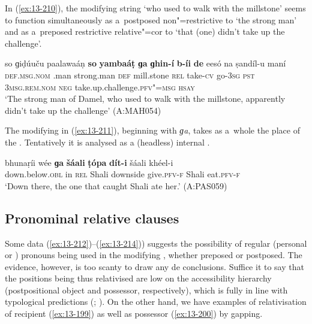 In (\ref{ex:13-210}), the modifying string `who used to walk with the millstone' seems to function simultaneously as a~postposed non"=restrictive  to `the \iliDameli strong man' and as a~preposed restrictive relative"=cor to `that (one) didn't take up the challenge'.

\begin{exe}
\ex
\label{ex:13-210}
\gll so ɡiḍúuču paalawaáṇ \textbf{so} \textbf{yambaáṭ} \textbf{ɡa} \textbf{ɡhin-í} \textbf{b-íi} \textbf{de} eesó na ṣandíl-u maní\\
\textsc{def.msg.nom} \iliDameli.man strong.man \textsc{def} mill.stone \textsc{rel} take-\textsc{cv} go-\textsc{3sg} \textsc{pst} \textsc{3msg.rem.nom} \textsc{neg} take.up.challenge.\textsc{pfv"=msg} \textsc{hsay}\\
\glt `The strong man of Damel, who used to walk with the millstone, apparently didn't take up the challenge' (A:MAH054)
\end{exe}

The modifying  in (\ref{ex:13-211}), beginning with \textit{ɡa}, takes as a~whole the place of the  . Tentatively it is analysed as a (headless) internal .

\begin{exe}
\ex
\label{ex:13-211}
\gll bhunaṛíi wée \textbf{ɡa} \textbf{šáali} \textbf{ṭópa} \textbf{dít-i}  šáali khéel-i \\
down.below.\textsc{obl} in \textsc{rel} Shali downside give.\textsc{pfv-f} Shali eat.\textsc{pfv-f} \\
\glt `Down there, the one that caught Shali ate her.' (A:PAS059)
\end{exe}

\subsection{Pronominal relative clauses}
\label{subsec:13-6-5}


Some data (\ref{ex:13-212})--(\ref{ex:13-214})) suggests the possibility of regular  (personal or ) pronouns being used in the modifying , whether preposed or postposed. The evidence, however, is too scanty to draw any de conclusions. Suffice it to say that the positions being thus relativised are low on the accessibility hierarchy (postpositional object and possessor, respectively), which is fully in line with typological predictions (\citealt[147--148]{keenan1985}; \citealt[226]{andrews_relative2007}). On the other hand, we have examples of relativisation of recipient (\ref{ex:13-199}) as well as possessor (\ref{ex:13-200}) by gapping.

